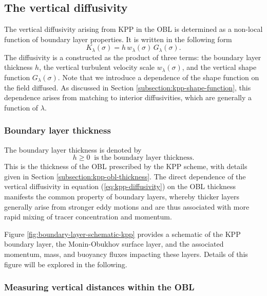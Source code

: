 \subsection{The vertical diffusivity}
\label{subsection:kpp-vertical-diffusivity}

The vertical diffusivity arising from KPP in the OBL is determined as
a non-local function of boundary layer properties. It is written in
the following form
\begin{equation}
  K_{\lambda}(\sigma) = h \, w_{\lambda}(\sigma) \, G_{\lambda}(\sigma).
\label{eq:kpp-diffusivity}
\end{equation}
The diffusivity is a constructed as the product of three terms: the
boundary layer thickness $h$, the vertical turbulent velocity scale
$w_{\lambda}(\sigma)$, and the vertical shape function
$G_{\lambda}(\sigma)$.  Note that we introduce a dependence of the
shape function on the field diffused.  As discussed in Section
\ref{subsection:kpp-shape-function}, this dependence arises from
matching to interior diffusivities, which are generally a function of
$\lambda$.


\subsubsection{Boundary layer thickness} 

The boundary layer thickness is denoted by 
\begin{equation}
 h \ge 0 \; \; \mbox{is the boundary layer thickness}.
\label{eq:boundary-layer-thickness}
\end{equation}
This is the thickness of the OBL prescribed by the KPP scheme, with
details given in Section \ref{subsection:kpp-obl-thickness}. The
direct dependence of the vertical diffusivity in equation
(\ref{eq:kpp-diffusivity}) on the OBL thickness manifests the common
property of boundary layers, whereby thicker layers generally arise
from stronger eddy motions and are thus associated with more rapid
mixing of tracer concentration and momentum.

Figure \ref{fig:boundary-layer-schematic-kpp} provides a schematic of
the KPP boundary layer, the Monin-Obukhov surface layer, and the
associated momentum, mass, and buoyancy fluxes impacting these layers.
Details of this figure will be explored in the following.



\subsubsection{Measuring vertical distances within the OBL}

